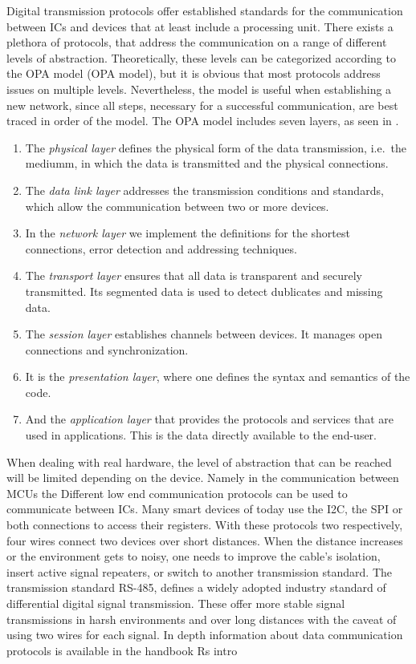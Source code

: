 Digital transmission protocols offer established standards for the communication between \ac{IC}s and devices that at least include a processing unit. There exists a plethora of protocols, that address the communication on a range of different levels of abstraction. Theoretically, these levels can be categorized according to the \acl{OPA} model (\acs{OPA} model), but it is obvious that most protocols address issues on multiple levels. Nevertheless, the model is useful when establishing a new network, since all steps, necessary for a successful communication, are best traced in order of the model. The \ac{OPA} model includes seven layers, as seen in .
\begin{enumerate}
  \item The \emph{physical layer} defines the physical form of the data transmission, i.e.\ the mediumm, in which the data is transmitted and the physical connections.
  \item The \emph{data link layer} addresses the transmission conditions and standards, which allow the communication between two or more devices.
  \item In the \emph{network layer} we implement the definitions for the shortest connections, error detection and addressing techniques.
  \item The \emph{transport layer} ensures that all data is transparent and securely transmitted. Its segmented data is used to detect dublicates and missing data.
  \item The \emph{session layer} establishes channels between devices. It manages open connections and synchronization.
  \item It is the \emph{presentation layer}, where one defines the syntax and semantics of the code.
  \item And the \emph{application layer} that provides the protocols and services that are used in applications. This is the data directly available to the end-user.
\end{enumerate}

When dealing with real hardware, the level of abstraction that can be reached will be limited depending on the device. Namely in the communication between \ac{MCU}s the
Different low end communication protocols can be used to communicate between \ac{IC}s. Many smart devices of today use the \acf{I2C}, the \acf{SPI} or both connections to access their registers. With these protocols two respectively, four wires connect two devices over short distances. When the distance increases or the environment gets to noisy, one needs to improve the cable's isolation, insert active signal repeaters, or switch to another transmission standard.
The transmission standard \acs{RS}-485, defines a widely adopted industry standard of differential digital signal transmission. These offer more stable signal transmissions in harsh environments and over long distances with the caveat of using two wires for each signal.
In depth information about data communication protocols is available in the handbook \cite{buchanan2004handbook}
Rs intro \cite{marais2008rs}


